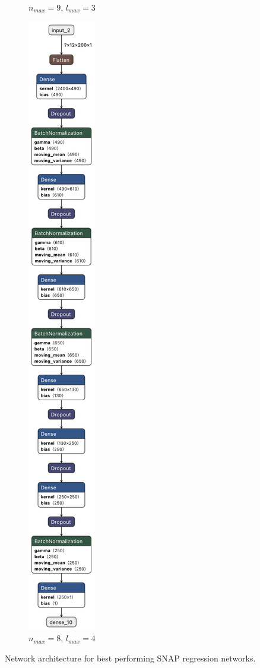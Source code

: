 \begin{figure}
\begin{subfigure}[t]{.155\textwidth}
    \caption{$n_{max}=9$, $l_{max}=3$}
  \end{subfigure}
  \hfill
  \begin{subfigure}[t]{.155\textwidth}
    \centering
    \includegraphics[width=\linewidth]{figures/regression/model_8-4.png}
    \caption{$n_{max}=8$, $l_{max}=4$}
  \end{subfigure}

  \caption{Network architecture for best performing SNAP regression networks.
  }
  \label{fig:transferlearn}
\end{figure}


